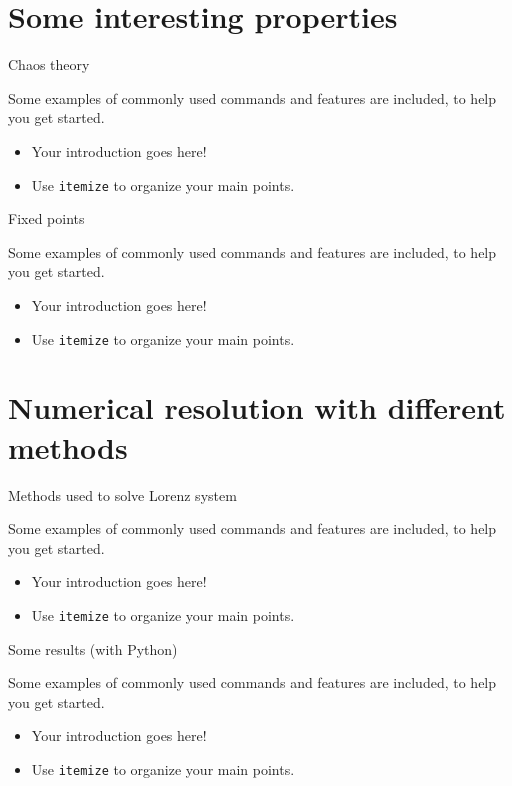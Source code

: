 \documentclass[10pt,xcolor={table,dvipsnames},t]{beamer}
\begin{document}
\section{Some interesting properties}

\begin{frame}{Chaos theory}

    Some examples of commonly used commands and features are included, to help you get started.
    \begin{itemize}
      \item Your introduction goes here!
      \item Use \texttt{itemize} to organize your main points.
    \end{itemize}

\end{frame}

\begin{frame}{Fixed points}

    Some examples of commonly used commands and features are included, to help you get started.
    \begin{itemize}
      \item Your introduction goes here!
      \item Use \texttt{itemize} to organize your main points.
    \end{itemize}

\end{frame}

\section{Numerical resolution with different methods}

\begin{frame}{Methods used to solve Lorenz system}

    Some examples of commonly used commands and features are included, to help you get started.
    \begin{itemize}
      \item Your introduction goes here!
      \item Use \texttt{itemize} to organize your main points.
    \end{itemize}

\end{frame}

\begin{frame}{Some results (with Python)}

    Some examples of commonly used commands and features are included, to help you get started.
    \begin{itemize}
      \item Your introduction goes here!
      \item Use \texttt{itemize} to organize your main points.
    \end{itemize}
    
\end{frame}
\end{document}
